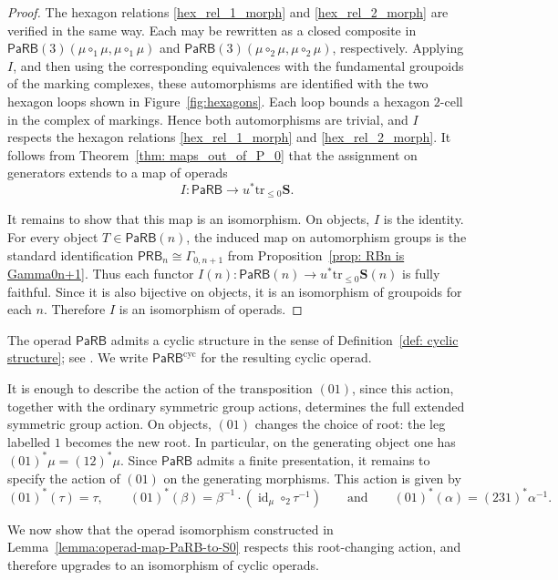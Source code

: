 \documentclass{amsart}
\newcommand{\bS}{\mathbf{S}}
\newcommand{\PaRB}{\mathsf{PaRB}}
\newcommand{\id}{\operatorname{id}}
\newcommand{\trun}[1]{\mathrm{tr}_{\leq{#1}}}
\newcommand{\PRB}{\mathsf{PRB}} %
\theoremstyle{definition}
\numberwithin{equation}{section}
\begin{document}
\begin{proof}
The hexagon relations \eqref{hex_rel_1_morph} and \eqref{hex_rel_2_morph} are verified in the same way. Each may be rewritten as a closed composite in $\PaRB(3)(\mu\circ_1\mu,\mu\circ_1\mu)$ and $\PaRB(3)(\mu\circ_2\mu,\mu\circ_2\mu)$, respectively. Applying $I$, and then using the corresponding equivalences with the fundamental groupoids of the marking complexes, these automorphisms are identified with the two hexagon loops shown in Figure~\ref{fig:hexagons}. Each loop bounds a hexagon $2$-cell in the complex of markings. Hence both automorphisms are trivial, and $I$ respects the hexagon relations \eqref{hex_rel_1_morph} and \eqref{hex_rel_2_morph}. It follows from Theorem~\ref{thm: maps_out_of_P_0}
that the assignment on generators extends to a map of operads
\[
I:\PaRB\longrightarrow u^*\trun{0}\bS.
\]


It remains to show that this map is an isomorphism. On objects, $I$ is the identity. For every object $T\in\PaRB(n)$, the induced map on automorphism groups is the standard identification $\PRB_n\cong \Gamma_{0,n+1}$ from Proposition~\ref{prop: RBn is Gamma0n+1}.
Thus each functor $I(n):\PaRB(n)\longrightarrow u^*\trun{0}\bS(n)$ is fully faithful. Since it is also bijective on objects, it is an isomorphism of groupoids for each $n$. Therefore $I$ is an isomorphism of operads.
\end{proof}


\medskip 


The operad $\PaRB$ admits a cyclic structure in the sense of Definition~\ref{def: cyclic structure}; see \cite{campos2019configuration,MW,robertson2025grothendieck}. We write $\PaRB^{\mathrm{cyc}}$ for the resulting cyclic operad.

It is enough to describe the action of the transposition $(01)$, since this action, together with the ordinary symmetric group actions, determines the full extended symmetric group action. On objects, $(01)$ changes the choice of root: the leg labelled $1$ becomes the new root. In particular, on the generating object one has $(01)^*\mu=(12)^*\mu.$  Since $\PaRB$ admits a finite presentation,  it remains to specify the action of $(01)$ on the generating morphisms. This action is given by
\begin{equation}\label{cyclic action on PaRB generators}\tag{$\star$}
(01)^*(\tau)=\tau,\qquad (01)^*(\beta)=\beta^{-1}\cdot(\id_{\mu}\circ_2\tau^{-1}) \qquad \text{and} \qquad (01)^*(\alpha)=(231)^*\alpha^{-1}.
\end{equation}


We now show that the operad isomorphism constructed in Lemma~\ref{lemma:operad-map-PaRB-to-S0} respects this root-changing action, and therefore upgrades to an isomorphism of cyclic operads.
\end{document}

